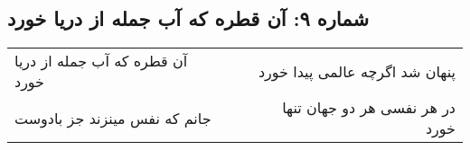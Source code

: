 \begin{center}
\section*{شماره ۹: آن قطره که آب جمله از دریا خورد}
\label{sec:009}
\begin{longtable}{l p{0.5cm} r}
آن قطره که آب جمله از دریا خورد
&&
پنهان شد اگرچه عالمی پیدا خورد
\\
جانم که نفس مینزند جز بادوست
&&
در هر نفسی هر دو جهان تنها خورد
\\
\end{longtable}
\end{center}
